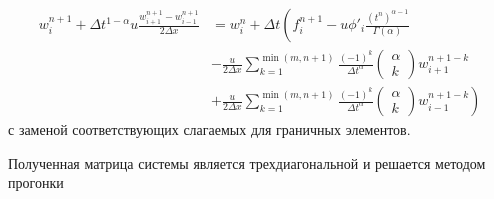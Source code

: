 
\begin{equation}
	\begin{split}
		w_i^{n+1} + \Delta t^{1- \alpha} u \frac{w_{i+1}^{n+1} - w_{i-1}^{n+1}}{2 \Delta x}
		&= w_i^{n} + \Delta t
		\left(
			f_i^{n+1} - u \phi'_{i}\frac{\left(t^n\right)^{\alpha - 1}}{\Gamma(\alpha)}
		\right.\\
			&- \frac{u}{2 \Delta x}
			\sum_{k=1}^{\min (m,n+1)}
			\frac{(-1)^k}{\Delta t^\alpha} \begin{pmatrix}\alpha \\ k \end{pmatrix}
			w^{n+1-k}_{i+1}\\
		&\left.
			+ \frac{u}{2 \Delta x}
			\sum_{k=1}^{\min (m,n+1)}
			\frac{(-1)^k}{\Delta t^\alpha} \begin{pmatrix}\alpha \\ k \end{pmatrix}
			w^{n+1-k}_{i-1}
		\right)
	\end{split}
\end{equation}
с заменой соответствующих слагаемых для граничных элементов.

Полученная матрица системы является трехдиагональной и решается методом прогонки


